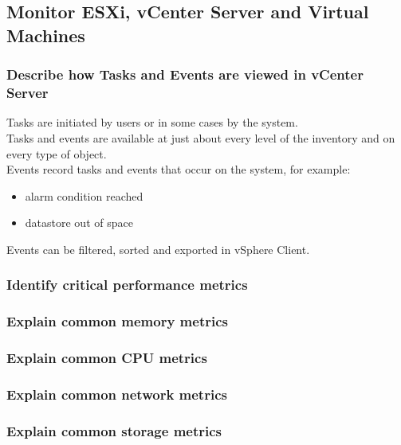 \subsection{Monitor ESXi, vCenter Server and Virtual Machines}

\subsubsection{Describe how Tasks and Events are viewed in vCenter Server}

Tasks are initiated by users or in some cases by the system.\\

Tasks and events are available at just about every level of the inventory
and on every type of object.\\

Events record tasks and events that occur on the system, for example:


\begin{itemize}
\item alarm condition reached
\item datastore out of space
\end{itemize}

Events can be filtered, sorted and exported in vSphere Client.

\subsubsection{Identify critical performance metrics}

\subsubsection{Explain common memory metrics}

\subsubsection{Explain common CPU metrics}

\subsubsection{Explain common network metrics}

\subsubsection{Explain common storage metrics}

